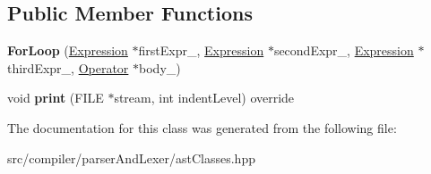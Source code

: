 \subsection*{Public Member Functions}
\begin{DoxyCompactItemize}
\item 
{\bfseries For\+Loop} (\hyperlink{classslang__AST__NODES_1_1Expression}{Expression} $\ast$first\+Expr\+\_\+, \hyperlink{classslang__AST__NODES_1_1Expression}{Expression} $\ast$second\+Expr\+\_\+, \hyperlink{classslang__AST__NODES_1_1Expression}{Expression} $\ast$third\+Expr\+\_\+, \hyperlink{classslang__AST__NODES_1_1Operator}{Operator} $\ast$body\+\_\+)\hypertarget{classslang__AST__NODES_1_1ForLoop_ad14ac995f22bc6ddddf40374a4225202}{}\label{classslang__AST__NODES_1_1ForLoop_ad14ac995f22bc6ddddf40374a4225202}

\item 
void {\bfseries print} (F\+I\+LE $\ast$stream, int indent\+Level) override\hypertarget{classslang__AST__NODES_1_1ForLoop_a92ccb559c47928fd9eb290b2e8dd9972}{}\label{classslang__AST__NODES_1_1ForLoop_a92ccb559c47928fd9eb290b2e8dd9972}

\end{DoxyCompactItemize}


The documentation for this class was generated from the following file\+:\begin{DoxyCompactItemize}
\item 
src/compiler/parser\+And\+Lexer/ast\+Classes.\+hpp\end{DoxyCompactItemize}
